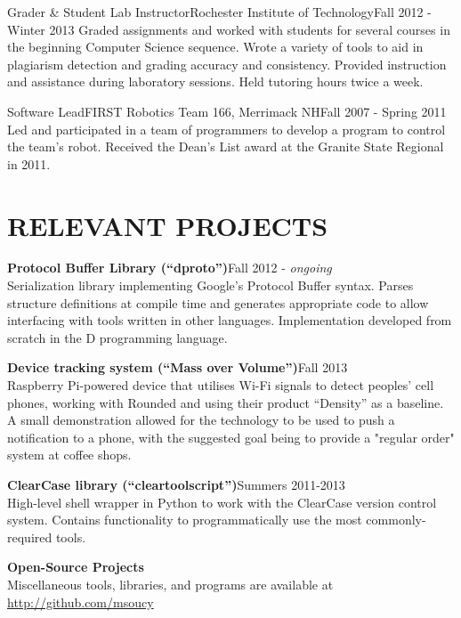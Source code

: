 \documentclass[line]{res}
\newcommand{\project}[2][]{{\bf #2}\hfill #1\\}
\def\ongoing{\textit{ongoing}}
\begin{document}
\begin{resume}
	\begin{job}{Grader \& Student Lab Instructor}{Rochester Institute of Technology}{Fall 2012 - Winter 2013}
		Graded assignments and worked with students for several courses in the beginning Computer Science sequence.
		Wrote a variety of tools to aid in plagiarism detection and grading accuracy and consistency.
		Provided instruction and assistance during laboratory sessions.
		Held tutoring hours twice a week.
	\end{job}

	\begin{job}{Software Lead}{FIRST Robotics Team 166, Merrimack NH}{Fall 2007 - Spring 2011}
		Led and participated in a team of programmers to develop a program to control the team's robot.
		Received the Dean's List award at the Granite State Regional in 2011.
	\end{job}

\section{RELEVANT PROJECTS}

	\project[Fall 2012 - \ongoing]   {Protocol Buffer Library (``dproto'')}
	Serialization library implementing Google's Protocol Buffer syntax.
	Parses structure definitions at compile time and generates appropriate code to allow interfacing with tools written in other languages.
	Implementation developed from scratch in the D programming language.

	\project[Fall 2013]              {Device tracking system (``Mass over Volume'')}
	Raspberry Pi-powered device that utilises Wi-Fi signals to detect peoples' cell phones, working with Rounded and using their product ``Density'' as a baseline.
	A small demonstration allowed for the technology to be used to push a notification to a phone, with the suggested goal being to provide a "regular order" system at coffee shops.

	\project[Summers 2011-2013]      {ClearCase library (``cleartoolscript'')}
	High-level shell wrapper in Python to work with the ClearCase version control system.
	Contains functionality to programmatically use the most commonly-required tools.

	\project                         {Open-Source Projects}
	Miscellaneous tools, libraries, and programs are available at \url{http://github.com/msoucy}


\end{resume}
\end{document}
